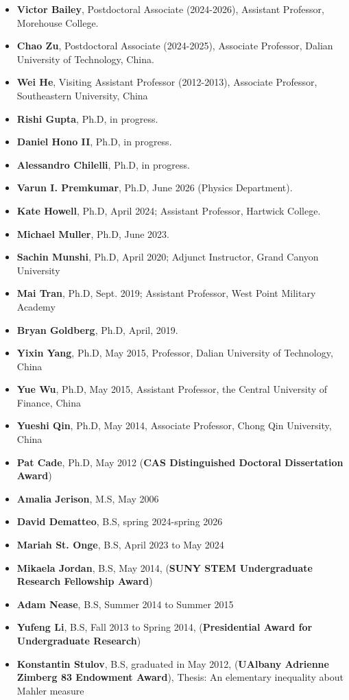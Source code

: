 \documentclass[12pt]{res} %
\begin{document}
\begin{resume}
   \begin{itemize} \itemsep -2pt  %
   \item \textbf{Victor Bailey}, Postdoctoral Associate (2024-2026), Assistant Professor, Morehouse College.
   \item \textbf{Chao Zu}, Postdoctoral Associate (2024-2025), Associate Professor, Dalian University of Technology, China.
   \item \textbf{Wei He}, Visiting Assistant Professor (2012-2013), Associate Professor, Southeastern University, China
   \item \textbf{Rishi Gupta}, Ph.D, in progress.
    \item \textbf{Daniel Hono II}, Ph.D, in progress.   
   \item \textbf{Alessandro Chilelli}, Ph.D, in progress.
   \item \textbf{Varun I. Premkumar}, Ph.D, June 2026 (Physics Department).   
   \item \textbf{Kate Howell}, Ph.D, April 2024; Assistant Professor, Hartwick College.
   \item \textbf{Michael Muller}, Ph.D, June 2023.
   \item \textbf{Sachin Munshi}, Ph.D, April 2020; Adjunct Instructor, Grand Canyon University
   \item \textbf{Mai Tran}, Ph.D, Sept. 2019; Assistant Professor, West Point Military Academy
   \item \textbf{Bryan Goldberg}, Ph.D, April, 2019.
   \item \textbf{Yixin Yang}, Ph.D, May 2015, Professor, Dalian University of Technology, China
   \item \textbf{Yue Wu}, Ph.D, May 2015, Assistant Professor, the Central University of Finance, China
  \item \textbf{Yueshi Qin}, Ph.D, May 2014, Associate Professor, Chong Qin University, China
  \item \textbf{Pat Cade}, Ph.D, May 2012 (\textbf{CAS Distinguished Doctoral Dissertation Award})
  \item \textbf{Amalia Jerison}, M.S, May 2006
  \item \textbf{David Dematteo}, B.S, spring 2024-spring 2026
  \item \textbf{Mariah St. Onge}, B.S, April 2023 to May 2024
   \item \textbf{Mikaela Jordan}, B.S, May 2014, (\textbf{SUNY STEM Undergraduate Research Fellowship Award})
	 \item \textbf{Adam Nease}, B.S, Summer 2014 to Summer 2015
         \item \textbf{Yufeng Li}, B.S, Fall 2013 to Spring 2014, (\textbf{Presidential Award for Undergraduate Research})
         \item \textbf{Konstantin Stulov}, B.S, graduated in May 2012, (\textbf{UAlbany Adrienne Zimberg 83 Endowment Award}), Thesis: An elementary inequality about Mahler measure
  \end{itemize} 


\end{resume}
\end{document}
